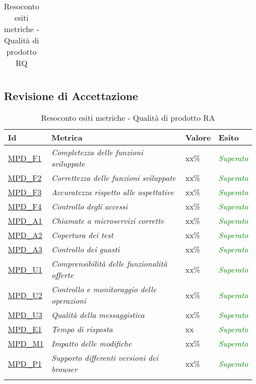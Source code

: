 \begin{longtable}{|>{\centering\arraybackslash}p{2cm}|>{\centering\arraybackslash}p{5cm}|>{\centering\arraybackslash}p{3cm}|>{\centering\arraybackslash}p{3cm}|}
			\caption{Resoconto esiti metriche - Qualità di prodotto RQ}
		\end{longtable}

	\subsection{Revisione di Accettazione}
	
	\begin{longtable}{|>{\centering\arraybackslash}p{2cm}|>{\centering\arraybackslash}p{5cm}|>{\centering\arraybackslash}p{3cm}|>{\centering\arraybackslash}p{3cm}|}
		\hline
		\rowcolor{Gray}
		\textbf{Id} & \textbf{Metrica} & \textbf{Valore} & \textbf{Esito} \\
		\hline
		\hyperlink{MPDF1}{MPD\_F1} & \textit{Completezza delle funzioni sviluppate} & xx\% & \textcolor{Green}{\textit{Superato}}\\
		\hline
		\hyperlink{MPDF2}{MPD\_F2} & \textit{Correttezza delle funzioni sviluppate} & xx\% & \textcolor{Green}{\textit{Superato}}\\
		\hline
		\hyperlink{MPDF3}{MPD\_F3} & \textit{Accuratezza rispetto alle aspettative} & xx\% & \textcolor{Green}{\textit{Superato}}\\
		\hline
		\hyperlink{MPDF4}{MPD\_F4} & \textit{Controllo degli accessi} & xx\% & \textcolor{Green}{\textit{Superato}}\\
		\hline
		\hyperlink{MPDA1}{MPD\_A1} & \textit{Chiamate a microservizi corrette} & xx\% & \textcolor{Green}{\textit{Superato}}\\
		\hline
		\hyperlink{MPDA2}{MPD\_A2} & \textit{Copertura dei test} & xx\% & \textcolor{Green}{\textit{Superato}}\\
		\hline
		\hyperlink{MPDA3}{MPD\_A3} & \textit{Controllo dei guasti} & xx\% & \textcolor{Green}{\textit{Superato}}\\
		\hline
		\hyperlink{MPDU1}{MPD\_U1} & \textit{Comprensibilità delle funzionalità offerte} & xx\% & \textcolor{Green}{\textit{Superato}}\\
		\hline
		\hyperlink{MPDU2}{MPD\_U2} & \textit{Controllo e monitoraggio delle operazioni} & xx\% & \textcolor{Green}{\textit{Superato}}\\
		\hline
		\hyperlink{MPDU3}{MPD\_U3} & \textit{Qualità della messaggistica} & xx\% & \textcolor{Green}{\textit{Superato}}\\
		\hline
		\hyperlink{MPDE1}{MPD\_E1} & \textit{Tempo di risposta} & xx & \textcolor{Green}{\textit{Superato}}\\
		\hline
		\hyperlink{MPDM1}{MPD\_M1} & \textit{Impatto delle modifiche} & xx\% & \textcolor{Green}{\textit{Superato}}\\
		\hline
		\hyperlink{MPDP1}{MPD\_P1} & \textit{Supporto differenti versioni dei browser} & xx\% & \textcolor{Green}{\textit{Superato}}\\
		\hline
		
		\caption{Resoconto esiti metriche - Qualità di prodotto RA}
	\end{longtable}